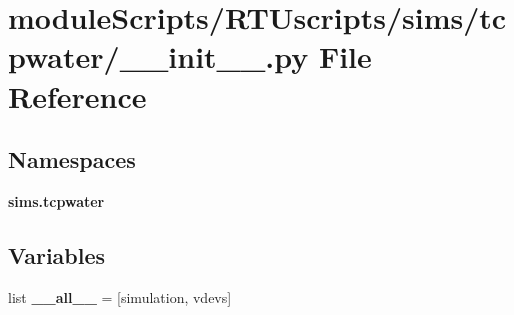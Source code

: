 \section{module\+Scripts/\+R\+T\+Uscripts/sims/tcpwater/\+\_\+\+\_\+init\+\_\+\+\_\+.py File Reference}
\label{sims_2tcpwater_2____init_____8py}
\subsection*{Namespaces}
\begin{DoxyCompactItemize}
\item 
 {\bf sims.\+tcpwater}
\end{DoxyCompactItemize}
\subsection*{Variables}
\begin{DoxyCompactItemize}
\item 
list {\bf \+\_\+\+\_\+all\+\_\+\+\_\+} = [\textquotesingle{}simulation\textquotesingle{}, \textquotesingle{}vdevs\textquotesingle{}]
\end{DoxyCompactItemize}
